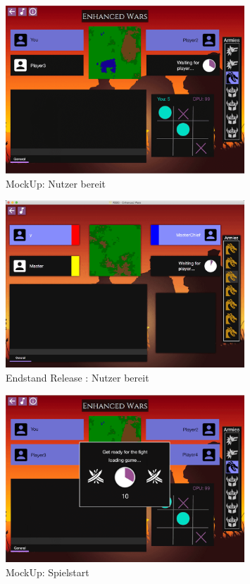 \documentclass[12pt, titlepage]{scrartcl}
\newcommand{\RN}[1]{%
	\textup{\uppercase\expandafter{\romannumeral#1}}%
}
\begin{document}
			\begin{figure}[H] 
				\centering
				\includegraphics[width=0.8\textwidth]{images/mockUps/Ready.png}
				\caption{MockUp: Nutzer bereit}
				\label{Ready_2}
			\end{figure}
			\begin{figure}[H] 
				\centering
				\includegraphics[width=0.8\textwidth]{images/endOfRelease/Ready.png}
				\caption{Endstand Release \RN{3}: Nutzer bereit}
				\label{End_Ready}
			\end{figure}
			\begin{figure}[H] 
				\centering
				\includegraphics[width=0.8\textwidth]{images/mockUps/StartGame.png}
				\caption{MockUp: Spielstart}
				\label{Game_Start_2}
			\end{figure}
\end{document}

